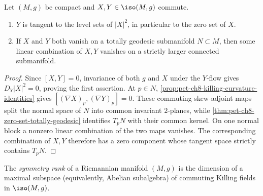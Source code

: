 \begin{proposition}
  \label{prop:pet-ch8-commuting-killing-fields-properties}
  Let $(M,g)$ be compact and $X,Y\in\iso(M,g)$ commute.
  \begin{enumerate}
    \item $Y$ is tangent to the level sets of $|X|^2$, in particular to the
      zero set of $X$.
    \item If $X$ and $Y$ both vanish on a totally geodesic submanifold
      $N\subset M$, then some linear combination of $X,Y$ vanishes on a
      strictly larger connected submanifold.
  \end{enumerate}
\end{proposition}
\begin{proof}
  \sketch
  Since \([X,Y]=0\), invariance of both \(g\) and \(X\) under the \(Y\)-flow
  gives \(D_Y|X|^2=0\), proving the first assertion. At \(p\in N\),
  \cref{prop:pet-ch8-killing-curvature-identities} gives
  \([(\nabla X)_p,(\nabla Y)_p]=0\). These commuting skew-adjoint maps split
  the normal space of \(N\) into common invariant \(2\)-planes, while
  \cref{thm:pet-ch8-zero-set-totally-geodesic} identifies \(T_pN\) with their
  common kernel. On one normal block a nonzero linear combination of the two
  maps vanishes. The corresponding combination of \(X,Y\) therefore has a
  zero component whose tangent space strictly contains \(T_pN\).
\end{proof}

\begin{definition}
  \label{def:pet-ch8-symmetry-rank}
  The \emph{symmetry rank} of a Riemannian manifold $(M,g)$ is the dimension of
  a maximal subspace (equivalently, Abelian subalgebra) of commuting Killing
  fields in $\iso(M,g)$.
\end{definition}

